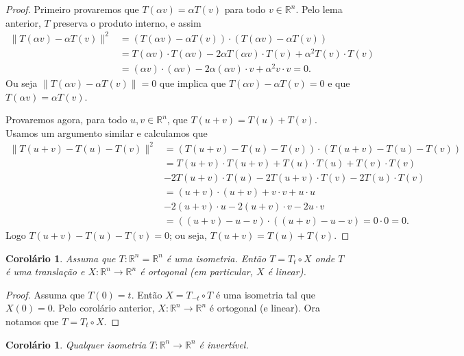 \documentclass[12pt]{amsart}
\newcommand{\R}{\mathbb R}
\newtheorem{corollary}[theorem]{Corolário}
\theoremstyle{definition}
\begin{document}
\begin{proof}
Primeiro provaremos que $T(\alpha v)=\alpha T(v)$ para todo $v\in \R^n$. 
Pelo lema anterior, $T$ preserva o produto interno, e assim 
\begin{align*}
    \|T(\alpha v)-\alpha T(v)\|^2&=(T(\alpha v)-\alpha T(v))\cdot (T(\alpha v)-\alpha T(v))
    \\&=T(\alpha v)\cdot T(\alpha v)-2\alpha T(\alpha v)\cdot T(v)+\alpha^2T(v)\cdot T(v)\\&=
    (\alpha v)\cdot (\alpha v)-2\alpha (\alpha v)\cdot v+\alpha^2 v\cdot v=0.
\end{align*}
Ou seja $\|T(\alpha v)-\alpha T(v)\|=0$ que implica que $T(\alpha v)-\alpha T(v)=0$ e que 
$T(\alpha v)=\alpha T(v)$.  

Provaremos agora, para todo $u,v\in\R^n$, que $T(u+v)=T(u)+T(v)$. Usamos um argumento similar e calculamos que 
\begin{align*}
    \|T(u+v)-T(u)-T(v)\|^2&=(T(u+v)-T(u)-T(v))\cdot (T(u+v)-T(u)-T(v))\\&=
    T(u+v)\cdot T(u+v)+T(u)\cdot T(u)+T(v)\cdot T(v)\\&-2T(u+v)\cdot T(u)-2T(u+v)\cdot T(v)-2T(u)\cdot T(v)\\&=
    (u+v)\cdot (u+v)+v\cdot v+u\cdot u\\&-2(u+v)\cdot u-2(u+v)\cdot v-2u\cdot v
    \\&=((u+v)-u-v)\cdot((u+v)-u-v)=0\cdot 0=0.
\end{align*}
Logo $T(u+v)-T(u)-T(v)=0$; ou seja, $T(u+v)=T(u)+T(v)$.
\end{proof}

\begin{corollary}
    Assuma que $T:\R^n=\R^n$ é uma isometria. Então $T=T_t\circ X$ onde $T$ é uma translação e 
    $X:\R^n\to \R^n$ é ortogonal (em particular, $X$ é linear). 
\end{corollary}
\begin{proof}
    Assuma que $T(0)=t$. Então $X=T_{-t}\circ T$ é uma isometria tal que $X(0)=0$. Pelo corolário anterior,
    $X:\R^n\to \R^n$ é ortogonal (e linear). Ora notamos que $T=T_{t}\circ X$.
\end{proof}

\begin{corollary}
    Qualquer isometria $T:\R^n\to\R^n$ é invertível. 
\end{corollary}
\end{document}
